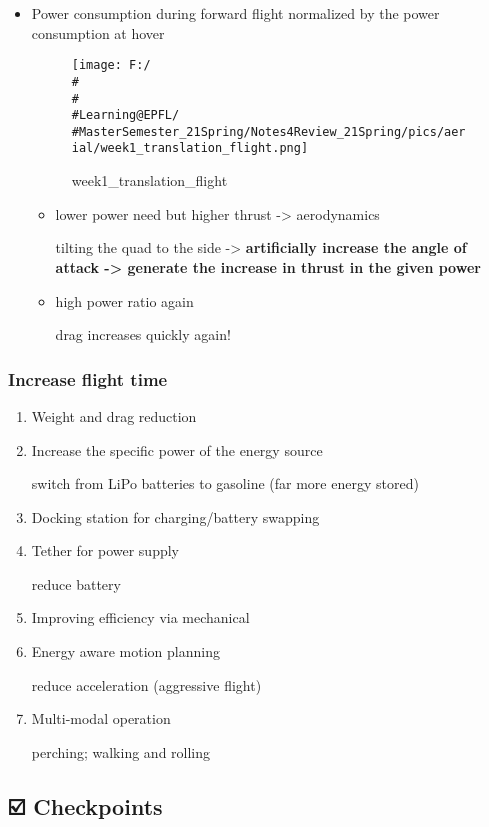 \documentclass[]{article}
\begin{document}
\begin{itemize}
\item
  Power consumption during forward flight normalized by the power
  consumption at hover

  \begin{figure}
  \centering
  \texttt{[image: F:/\\\#\\\#\\\#Learning@EPFL/\\\#MasterSemester\_21Spring/Notes4Review\_21Spring/pics/aerial/week1\_translation\_flight.png]}
  \caption{week1\_translation\_flight}
  \end{figure}

  \begin{itemize}
  \item
    lower power need but higher thrust -\textgreater{} aerodynamics

    tilting the quad to the side -\textgreater{} \textbf{artificially
    increase the angle of attack -\textgreater{} generate the increase
    in thrust in the given power}
  \item
    high power ratio again

    drag increases quickly again!
  \end{itemize}
\end{itemize}

\subsubsection{Increase flight time}\label{header-n404}

\begin{enumerate}
\def\labelenumi{\arabic{enumi}.}
\item
  Weight and drag reduction
\item
  Increase the specific power of the energy source

  switch from LiPo batteries to gasoline (far more energy stored)
\item
  Docking station for charging/battery swapping
\item
  Tether for power supply

  reduce battery
\item
  Improving efficiency via mechanical
\item
  Energy aware motion planning

  reduce acceleration (aggressive flight)
\item
  Multi-modal operation

  perching; walking and rolling
\end{enumerate}

\subsection{☑️ Checkpoints}\label{header-n424}
\end{document}
